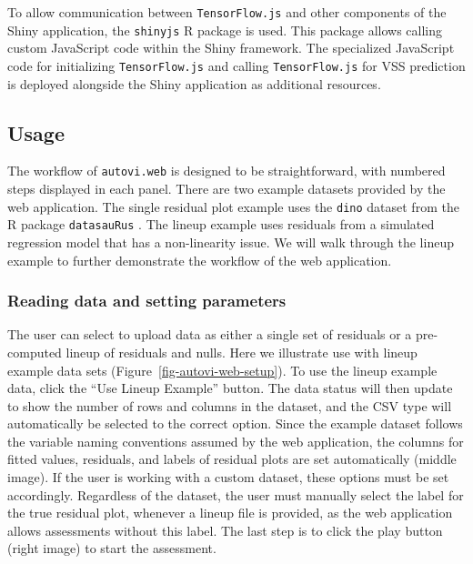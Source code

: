 \documentclass[
doublespace,
  times]{anzsauth}
\begin{document}
To allow communication between \texttt{TensorFlow.js} and other
components of the Shiny application, the \texttt{shinyjs} R package is
used. This package allows calling custom JavaScript code within the
Shiny framework. The specialized JavaScript code for initializing
\texttt{TensorFlow.js} and calling \texttt{TensorFlow.js} for VSS
prediction is deployed alongside the Shiny application as additional
resources.

\subsection{Usage}\label{sec-autovi-web-workflow}

The workflow of \texttt{autovi.web} is designed to be straightforward,
with numbered steps displayed in each panel. There are two example
datasets provided by the web application. The single residual plot
example uses the \texttt{dino} dataset from the R package
\texttt{datasauRus} \citep{datasaurus}. The lineup example uses
residuals from a simulated regression model that has a non-linearity
issue. We will walk through the lineup example to further demonstrate
the workflow of the web application.

\subsubsection{Reading data and setting
parameters}\label{reading-data-and-setting-parameters}

The user can select to upload data as either a single set of residuals
or a pre-computed lineup of residuals and nulls. Here we illustrate use
with lineup example data sets (Figure~\ref{fig-autovi-web-setup}). To
use the lineup example data, click the ``Use Lineup Example'' button.
The data status will then update to show the number of rows and columns
in the dataset, and the CSV type will automatically be selected to the
correct option. Since the example dataset follows the variable naming
conventions assumed by the web application, the columns for fitted
values, residuals, and labels of residual plots are set automatically
(middle image). If the user is working with a custom dataset, these
options must be set accordingly. Regardless of the dataset, the user
must manually select the label for the true residual plot, whenever a
lineup file is provided, as the web application allows assessments
without this label. The last step is to click the play button (right
image) to start the assessment.
\end{document}
